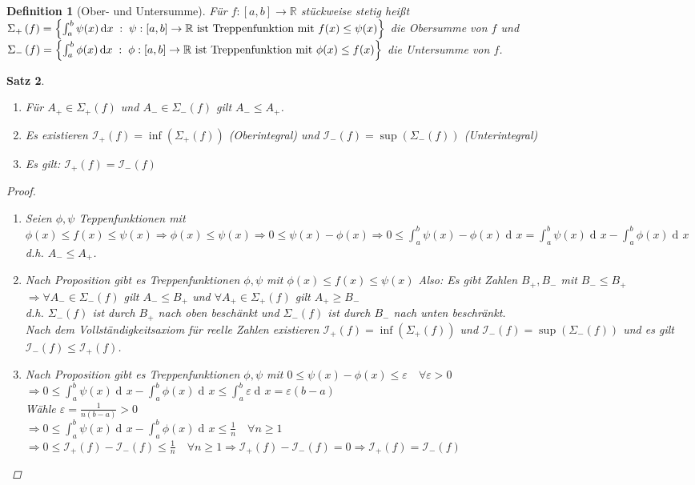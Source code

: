 \documentclass[a4paper,titlepage,oneside]{article}
\def\R{\ensuremath{\mathbb{R}} }
\renewcommand{\epsilon}{\ensuremath{\varepsilon} }
\newcommand{\der}{\operatorname{d\!}{}}
\def\sp{\hspace{0,1cm}}
\newcommand{\menge}[2]{\ensuremath{\left\{#1\sp : \sp #2\right\}}}
\newcommand{\integral}[4][x]{\ensuremath{\int_{#2}^{#3}{#4\der #1}}}
\newcommand{\intAB}[2][x]{\integral[#1]{a}{b}{#2}}
\newcommand{\OS}[1]{\ensuremath{\Sigma_+\left(#1\right)}}
\newcommand{\US}[1]{\ensuremath{\Sigma_-\left(#1\right)}}
\newcommand{\OI}[1]{\ensuremath{\mathcal{I}_+\left(#1\right)}}
\newcommand{\UI}[1]{\ensuremath{\mathcal{I}_-\left(#1\right)}}
\theoremstyle{thmstyle}
\newtheorem{satz}{Satz}[section]
\newtheorem{defi}[satz]{Definition}
\theoremstyle{subthmstyle}
\begin{document}
\begin{defi}[Ober- und Untersumme]
Für $f :[a,b] \to \R$ stückweise stetig heißt $ \OS{f} = \menge{\intAB{\psi(x)}}{\psi : [a,b] \to \R \text{ ist Treppenfunktion mit } f(x) \le \psi(x)}$ die Obersumme von $f$ und $ \US{f} = \menge{\intAB{\phi(x)}}{\phi : [a,b] \to \R \text{ ist Treppenfunktion mit } \phi(x) \le f(x)}$ die Untersumme von $f$.
\end{defi}

\begin{satz}
\begin{enumerate}
\item Für $A_+ \in \OS{f}$ und $A_- \in \US{f}$ gilt $A_- \le A_+$.
\item Es existieren $\OI{f} = \inf(\OS{f})$ (Oberintegral) und  $\UI{f} = \sup(\US{f})$ (Unterintegral)
\item Es gilt: $\OI{f} = \UI{f}$
\end{enumerate}
\begin{proof}
\begin{enumerate}
\item Seien $\phi, \psi$ Teppenfunktionen mit $ \phi(x) \le f(x) \le \psi(x) \Rightarrow \phi(x) \le \psi(x) \Rightarrow 0 \le \psi(x) - \phi(x) \Rightarrow 0 \le \intAB{\psi(x) - \phi(x)} = \intAB{\psi(x)} - \intAB{\phi(x)}$ d.h. $A_- \le A_+$.
\item Nach Proposition gibt es Treppenfunktionen $\phi, \psi$ mit $\phi(x) \le f(x) \le \psi(x)$ Also: Es gibt Zahlen $B_+, B_-$ mit $B_- \le B_+$\\
$\Rightarrow \forall A_- \in \US{f}$ gilt $ A_- \le B_+$ und $\forall A_+ \in \OS{f}$ gilt $ A_+ \ge B_-$\\
d.h. $\US{f}$ ist durch $B_+$ nach oben beschänkt und $\US{f}$ ist durch $B_-$ nach unten beschränkt.\\
Nach dem Vollständigkeitsaxiom für reelle Zahlen existieren $\OI{f}  = \inf(\OS{f})$ und $\UI{f} = \sup(\US{f})$ und es gilt $\UI{f} \le \OI{f}$.
\item Nach Proposition gibt es Treppenfunktionen $\phi, \psi$ mit $ 0 \le \psi(x) - \phi(x) \le \epsilon \quad \forall \epsilon > 0$\\
$\Rightarrow 0 \le \intAB{\psi(x)} - \intAB{\phi(x)} \le \intAB{\epsilon} = \epsilon(b-a)$\\
Wähle $\displaystyle \epsilon = \frac{1}{n(b-a)} > 0$\\
$\Rightarrow 0 \le \intAB{\psi(x)} - \intAB{\phi(x)} \le \frac{1}{n} \quad \forall n \ge 1$ \\
$\Rightarrow 0 \le \OI{f} - \UI{f} \le \frac{1}{n} \quad \forall n \ge 1 \Rightarrow \OI{f} - \UI{f} = 0 \Rightarrow \OI{f} = \UI{f}$
\end{enumerate}
\end{proof}
\end{satz}
\end{document}
